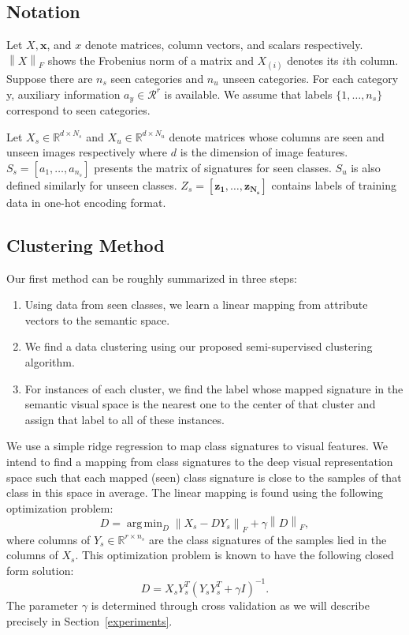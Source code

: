\documentclass[10pt,twocolumn,letterpaper]{article}
\newcommand{\norm}[1]{\left \lVert #1 \right \rVert_{F}}
\DeclareMathOperator*{\argmin}{arg\,min}
\begin{document}
\subsection{Notation}
Let $X, \mathbf{x}$, and $x$ denote matrices, column vectors, and scalars respectively. $\norm{X}$ shows the Frobenius norm of a matrix and
$X_{(i)}$ denotes its $i$th column.
Suppose there are $n_s$ seen categories and $n_u$ unseen categories. For each category y,
auxiliary information $a_y \in \mathcal{R}^r$ is available. We assume that labels $\{1, \ldots, n_s \}$ correspond to seen categories.

Let $X_s \in \mathbb{R}^{d \times N_s}$ and $X_u \in \mathbb{R}^{d \times N_u}$
denote matrices whose columns are seen and unseen images respectively where $d$ is the dimension of image features.
$S_s = [a_1, \ldots, a_{n_s}]$ presents the matrix of signatures for seen classes. $S_u$ is also defined similarly for unseen classes.
$Z_s = [ \mathbf{z_1}, \ldots, \mathbf{z_{N_s}} ]$
contains labels of training data in one-hot encoding format.

\subsection{Clustering Method} \label{clustering}
Our first method can be roughly summarized in three steps:
\begin{enumerate}
  \item Using data from seen classes, we learn a linear mapping from attribute vectors to the semantic space.
  \item We find a data clustering using our proposed semi-supervised clustering algorithm.
  \item For instances of each cluster, we find the label whose mapped signature in the semantic visual space is the nearest one to the center of that cluster and assign that label to all of these instances.
\end{enumerate}

We use a simple ridge regression to map class signatures to visual features. We intend to find a mapping from class signatures to the deep visual representation space such that each mapped (seen) class signature is close to the samples of that class in this space in average.
The linear mapping is found using the following optimization problem:
\begin{equation} \label{eq:mapping}
  D = \argmin_D \norm{X_s - D Y_s} + \gamma \norm{D},
\end{equation}
where columns of $ Y_s \in \mathbb{R}^{r \times n_s} $ are the class signatures of the samples lied in the columns of $X_s$.
This optimization problem is known to have the following closed form solution:
\begin{equation} \label{eq:dic}
  D = X_s Y_s^T (Y_s Y_s^T + \gamma I)^{-1}.
\end{equation}
The parameter $\gamma$ is determined through cross validation as we will describe precisely in Section~\ref{experiments}.
\end{document}
